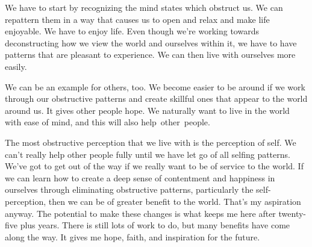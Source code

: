 \enlargethispage{-1\baselineskip}
We have to start by recognizing the mind states which obstruct us. We can repattern them in a way that causes us to open and relax and make life enjoyable. We have to enjoy life. Even though we're working towards deconstructing how we view the world and ourselves within it, we have to have patterns that are pleasant to experience. We can then live with ourselves more easily.

We can be an example for others, too. We become easier to be around if we work through our obstructive patterns and create skillful ones that appear to the world around us. It gives other people hope. We naturally want to live in the world with ease of mind, and this will also \mbox{help other people.}

The most obstructive perception that we live with is the perception of self. We can't really help other people fully until we have let go of all selfing patterns. We've got to get out of the way if we really want to be of service to the world. If we can learn how to create a deep sense of contentment and happiness in ourselves through eliminating obstructive patterns, particularly the self-perception, then we can be of greater benefit to the world. That's my aspiration anyway. The potential to make these changes is what keeps me here after twenty-five plus years. There is still lots of work to do, but many benefits have come along the way. It gives me hope, faith, and inspiration for the future.
